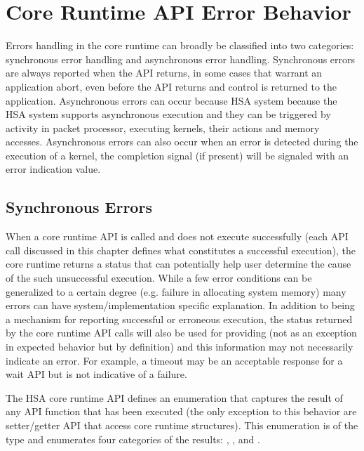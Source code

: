 \begin{DIFnomarkup}
\hypertarget{error}{}\section{Core Runtime API Error Behavior
}\label{error}
\end{DIFnomarkup}

Errors handling in the core runtime can broadly be classified into
two categories: synchronous error handling and asynchronous error
handling. Synchronous errors are always reported when the API
returns,
in some cases that warrant an application abort, even
before the API returns and control is returned to the application.
Asynchronous errors can occur because HSA system because the HSA
system supports asynchronous execution and they can be triggered by
activity in packet processor, executing kernels, their actions and
memory accesses. Asynchronous errors can also occur when an error
is detected during the execution of a kernel, the completion signal
(if present) will be signaled with an error indication value. 


\begin{DIFnomarkup}
\hypertarget{error}{}\subsection{Synchronous Errors }\label{syncerror}
\end{DIFnomarkup}

When a core runtime API is called and does not execute successfully
(each API call discussed in this chapter defines what constitutes a
successful execution), the core runtime returns a status that can
potentially help user determine the cause of the such unsuccessful
execution.  While a few error conditions can be generalized to a
certain degree (e.g. failure in allocating system memory) many
errors can have system/implementation specific explanation. In
addition to being a mechanism for reporting successful or erroneous
execution, the status returned by the core runtime API calls will also
be used for providing  (not as an exception in
expected behavior but by definition) and this information may not
necessarily indicate an error. For example, a timeout may be an
acceptable response for a wait API but is not indicative of a
failure.  

The HSA core runtime API defines an enumeration that captures the
result of any API function that has been executed (the only
exception to this behavior are setter/getter API that access core
runtime structures). This enumeration is of the type
 and enumerates four categories of the
results: , ,  and
. 

